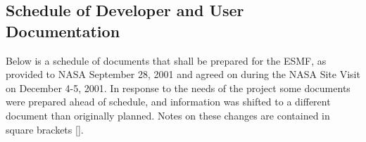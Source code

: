 
\subsection{Schedule of Developer and User Documentation}
\label{sec:docs}

Below is a schedule of documents that shall be prepared for the ESMF, as provided
to NASA September 28, 2001 and agreed on during the NASA Site Visit on 
December 4-5, 2001.  In response to the needs of the project some documents 
were prepared ahead of schedule, and information was shifted to a different 
document than originally planned.  Notes on these changes are contained in 
square brackets [].

